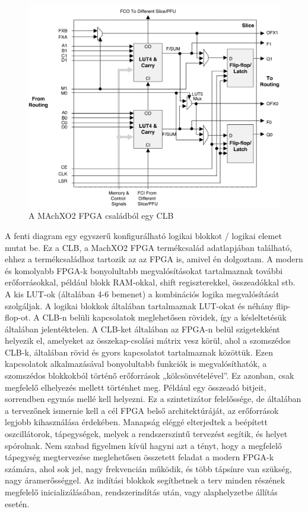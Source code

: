 \documentclass[a4paper,12pt,oneside]{book}
\begin{document}
\begin{figure}[H]
	\centering
	\includegraphics[trim=1mm 1mm 1mm 1mm,scale=0.38]{logickblockfromx02.png}
	\caption{A MAchXO2 FPGA családból egy CLB \cite{fpgaadatlap}}
	\label{CLB}
\end{figure}

A fenti diagram egy egyszerű konfigurálható logikai blokkot / logikai elemet mutat be. Ez a CLB, a MachXO2 FPGA termékcsalád adatlapjában található, ehhez a termékcsaládhoz tartozik az az FPGA is, amivel én dolgoztam. A modern és komolyabb FPGA-k bonyolultabb megvalósításokat tartalmaznak további erőforrásokkal, például blokk RAM-okkal, shift regiszterekkel, összeadókkal stb. A kis LUT-ok (általában 4-6 bemenet) a kombinációs logika megvalósítását szolgáljak. A logikai blokkok általában tartalmaznak LUT-okat és néhány flip-flop-ot. A CLB-n belüli kapcsolatok meglehetősen rövidek, így a késleltetésük általában jelentéktelen. A CLB-ket általában az FPGA-n belül szigetekként helyezik el, amelyeket az összekap-csolási mátrix vesz körül, ahol a szomszédos CLB-k, általában rövid és gyors kapcsolatot tartalmaznak közöttük. Ezen kapcsolatok alkalmazásával bonyolultabb funkciók is megvalósíthatók, a szomszédos blokkokból történő erőforrások „kölcsönvételével”. Ez azonban, csak megfelelő elhelyezés mellett történhet meg. Például egy összeadó bitjeit, sorrendben egymás mellé kell helyezni. Ez a szintetizátor felelőssége, de általában a tervezőnek ismernie kell a cél FPGA belső architektúráját, az erőforrások legjobb kihasználása érdekében. Manapság eléggé elterjedtek a beépített oszcillátorok, tápegységek, melyek a rendszerszintű tervezést segítik, és helyet spórolnak. Nem szabad figyelmen kívül hagyni azt a tényt, hogy a megfelelő tápegység megtervezése meglehetősen összetett feladat a modern FPGA-k számára, ahol sok jel, nagy frekvencián működik, és több tápsínre van szükség, nagy áramerősséggel. Az indítási blokkok segíthetnek a terv minden részének megfelelő inicializálásában, rendszerindítás után, vagy alaphelyzetbe állítás esetén. 
\end{document}
